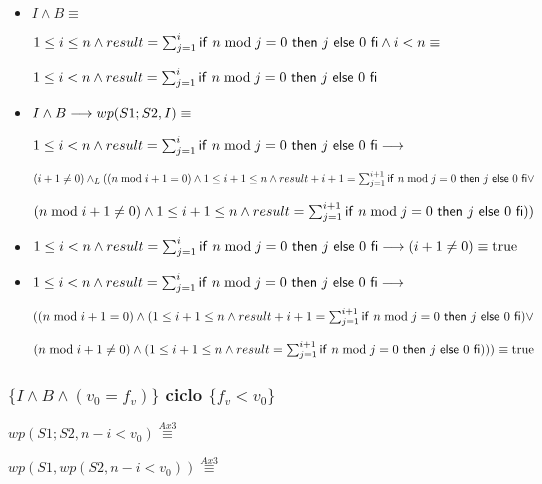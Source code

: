 \documentclass{article}
\begin{document}
\begin{itemize}
    \item $I \wedge B \equiv$
    
    $1 \leq i \leq n \wedge result = \sum_{j=1}^{i} \mathsf{if}\ n \bmod j = 0\ \mathsf{then}\ j\ \mathsf{else}\ 0\ \mathsf{fi} \wedge i < n \equiv$

    $1 \leq i < n \wedge result = \sum_{j=1}^{i} \mathsf{if}\ n \bmod j = 0\ \mathsf{then}\ j\ \mathsf{else}\ 0\ \mathsf{fi}$

    \item $I \wedge B \longrightarrow wp(S1;S2, I) \equiv$

    $1 \leq i < n \wedge result = \sum_{j=1}^{i} \mathsf{if}\ n \bmod j = 0\ \mathsf{then}\ j\ \mathsf{else}\ 0\ \mathsf{fi} \longrightarrow$

    $(i+1 \neq 0) \land _L ((n \bmod i+1 = 0) \wedge 1 \leq i+1 \leq n \wedge result + i+1 = \sum_{j=1}^{i+1} \mathsf{if}\ n \bmod j = 0\ \mathsf{then}\ j\ \mathsf{else}\ 0\ \mathsf{fi} \vee$

    $ (n \bmod i+1 \neq 0 ) \wedge 1 \leq i+1 \leq n \wedge result = \sum_{j=1}^{i+1} \mathsf{if}\ n \bmod j = 0\ \mathsf{then}\ j\ \mathsf{else}\ 0\ \mathsf{fi}))$

    \item $1 \leq i < n \wedge result = \sum_{j=1}^{i} \mathsf{if}\ n \bmod j = 0\ \mathsf{then}\ j\ \mathsf{else}\ 0\ \mathsf{fi} \longrightarrow (i+1 \neq 0) \equiv \mathrm{true}$ 
    
    \item $1 \leq i < n \wedge result = \sum_{j=1}^{i} \mathsf{if}\ n \bmod j = 0\ \mathsf{then}\ j\ \mathsf{else}\ 0\ \mathsf{fi} \longrightarrow$
    
    $((n \bmod i+1 = 0) \wedge (1 \leq i+1 \leq n \wedge result + i+1 = \sum_{j=1}^{i+1} \mathsf{if}\ n \bmod j = 0\ \mathsf{then}\ j\ \mathsf{else}\ 0\ \mathsf{fi}) \vee$

    $ (n \bmod i+1 \neq 0 ) \wedge (1 \leq i+1 \leq n \wedge result = \sum_{j=1}^{i+1} \mathsf{if}\ n \bmod j = 0\ \mathsf{then}\ j\ \mathsf{else}\ 0\ \mathsf{fi}))) \equiv \mathrm{true}$
\end{itemize}
    
\subsubsection*{$\{I \wedge B \wedge (v_{0} = f_{v})\}$ ciclo $\{f_{v} < v_{0}\}$}

$wp(S1;S2, n-i<v_{0}) \stackrel{Ax3}{\equiv}$

$wp(S1, wp(S2, n-i<v_{0})) \stackrel{Ax3}{\equiv}$
\end{document}
